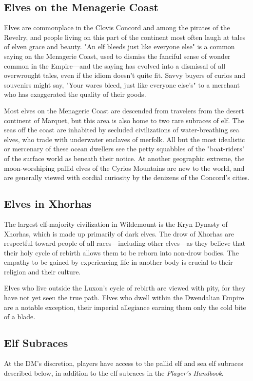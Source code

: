 \documentclass[10pt,a4paper,twoside,bg=print,twocolumn,openany,nodeprecatedcode]{dndbook}
\begin{document}
\subsection{Elves on the Menagerie Coast}
Elves are commonplace in the Clovis Concord and among the pirates of the Revelry, and people living on this part of the continent most often laugh at tales of elven grace and beauty. "An elf bleeds just like everyone else" is a common saying on the Menagerie Coast, used to dismiss the fanciful sense of wonder common in the Empire—and the saying has evolved into a dismissal of all overwrought tales, even if the idiom doesn't quite fit. Savvy buyers of curios and souvenirs might say, "Your wares bleed, just like everyone else's" to a merchant who has exaggerated the quality of their goods.

Most elves on the Menagerie Coast are descended from travelers from the desert continent of Marquet, but this area is also home to two rare subraces of elf. The seas off the coast are inhabited by secluded civilizations of water-breathing sea elves, who trade with underwater enclaves of merfolk. All but the most idealistic or mercenary of these ocean dwellers see the petty squabbles of the "boat-riders" of the surface world as beneath their notice. At another geographic extreme, the moon-worshiping pallid elves of the Cyrios Mountains are new to the world, and are generally viewed with cordial curiosity by the denizens of the Concord's cities.

\subsection{Elves in Xhorhas}
The largest elf-majority civilization in Wildemount is the Kryn Dynasty of Xhorhas, which is made up primarily of dark elves. The drow of Xhorhas are respectful toward people of all races—including other elves—as they believe that their holy cycle of rebirth allows them to be reborn into non-drow bodies. The empathy to be gained by experiencing life in another body is crucial to their religion and their culture.

Elves who live outside the Luxon's cycle of rebirth are viewed with pity, for they have not yet seen the true path. Elves who dwell within the Dwendalian Empire are a notable exception, their imperial allegiance earning them only the cold bite of a blade.

\subsection{Elf Subraces}
At the DM's discretion, players have access to the pallid elf and sea elf subraces described below, in addition to the elf subraces in the \textit{Player's Handbook}.
\end{document}
